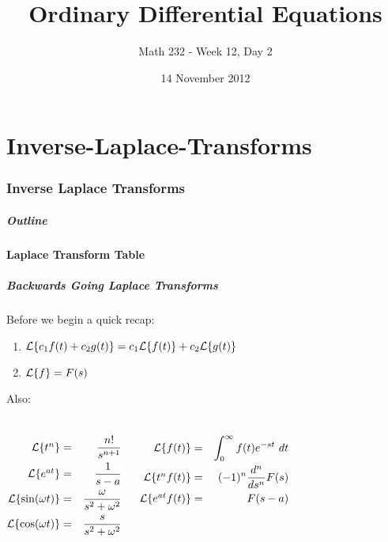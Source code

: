 \part{Inverse-Laplace-Transforms}
\section{Inverse Laplace Transforms}


\title{Ordinary Differential Equations}
\subtitle{Math 232 - Week 12, Day 2}
\date{14 November 2012}

\begin{frame}
  \titlepage
\end{frame}

\begin{frame}
  \frametitle{Outline}
\end{frame}


\subsection{Laplace Transform Table}

\begin{frame}
  \frametitle{Backwards Going Laplace Transforms }

  Before we begin a quick recap:
  \begin{enumerate}
  \item $\laplace{c_1 f(t) + c_2 g(t)}=c_1 \laplace{f(t)} + c_2 \laplace{g(t)}$
  \item $\laplace{f}=F(s)$
  \end{enumerate}

  Also:
  \begin{columns}
    \begin{eqnarray*}
      \laplace{t^n}    & = & \frac{n!}{s^{n+1}} \\ 
      \laplace{e^{at}} & = & \frac{1}{s-a} \\ 
      \laplace{\sin(\omega t)} & = & \frac{\omega}{s^2+\omega^2} \\
      \laplace{\cos(\omega t)} & = & \frac{s}{s^2+\omega^2} \\ 
    \end{eqnarray*}

    \begin{eqnarray*}
      \laplace{f(t)}  & = & \int^\infty_0 f(t) e^{-st} ~ dt \\ 
      \laplace{t^nf(t)} & = & (-1)^n\frac{d^n}{ds^n}F(s) \\
      \laplace{e^{at}f(t)} & = & F(s-a) 
    \end{eqnarray*}

  \end{columns}


\end{frame}

